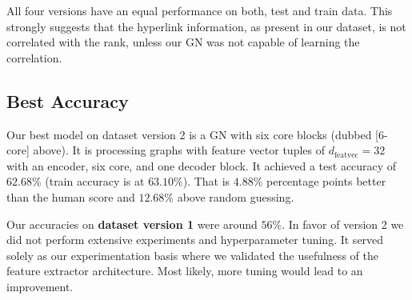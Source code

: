 All four versions have an equal performance on both, test and train data. This strongly suggests that the hyperlink information, as present in our dataset, is not correlated with the rank, unless our GN was not capable of learning the correlation.

\subsection{Best Accuracy}

Our best model on dataset version 2 is a GN with six core blocks (dubbed [6-core] above). It is processing graphs with feature vector tuples of $d_\text{featvec}=32$ with an encoder, six core, and one decoder block. It achieved a test accuracy of $62.68\%$ (train accuracy is at $63.10\%$). That is $4.88\%$ percentage points better than the human score and $12.68\%$ above random guessing.

Our accuracies on \textbf{dataset version 1} were around $56\%$. In favor of version 2 we did not perform extensive experiments and hyperparameter tuning. It served solely as our experimentation basis where we validated the usefulness of the feature extractor architecture. Most likely, more tuning would lead to an improvement.
